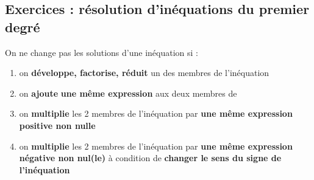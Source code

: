\documentclass[main.tex]{subfiles}
\begin{document}
\subsection{Exercices : résolution d'inéquations du premier degré}
\begin{tBox}
On ne change pas les solutions d'une inéquation si :
	\begin{enumerate}[label=\textbullet, leftmargin=*]
		\item on \textbf{développe, factorise, réduit} un des membres de l'inéquation
		\item on \textbf{ajoute}  \textbf{une même expression}  aux deux membres de 
		\item on \textbf{multiplie} les 2 membres de l'inéquation par \textbf{une même expression positive non nulle}
		\item  on \textbf{multiplie} les 2 membres de l'inéquation par \textbf{une même expression négative non nul(le)} à condition de  \textbf{changer le sens du signe de l'inéquation}
	\end{enumerate}  
\end{tBox}  
\end{document}

